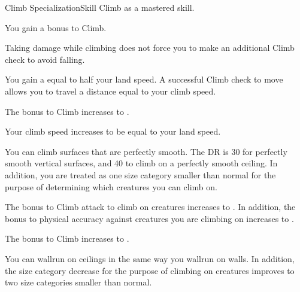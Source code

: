     \begin{feat}{Climb Specialization}{Skill}
        \featpre Climb as a mastered skill.
        \featben

         You gain a  bonus to Climb.

         Taking damage while climbing does not force you to make an additional Climb check to avoid falling.

         You gain a  equal to half your land speed.
        A successful Climb check to move allows you to travel a distance equal to your climb speed.


         The bonus to Climb increases to .

         Your climb speed increases to be equal to your land speed.

         You can climb surfaces that are perfectly smooth.
        The DR is 30 for perfectly smooth vertical surfaces, and 40 to climb on a perfectly smooth ceiling.
        In addition, you are treated as one size category smaller than normal for the purpose of determining which creatures you can climb on.

         The bonus to Climb attack to climb on creatures increases to .
        In addition, the bonus to physical accuracy against creatures you are climbing on increases to .

         The bonus to Climb increases to .

         You can wallrun on ceilings in the same way you wallrun on walls.
        In addition, the size category decrease for the purpose of climbing on creatures improves to two size categories smaller than normal.
    \end{feat}

